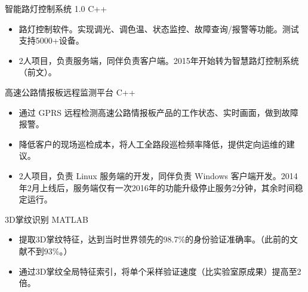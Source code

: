 \documentclass[10pt,a4paper]{moderncv/moderncv}
\begin{document}
{智能路灯控制系统 1.0}
{C++}
{}{}
{
\begin{itemize}
	\item 路灯控制软件。实现调光、调色温、状态监控、故障查询/报警等功能。测试支持5000+设备。
	\item 2人项目，负责服务端，同伴负责客户端。2015年开始转为智慧路灯控制系统（前文）。
\end{itemize}
}

{高速公路情报板远程监测平台}
{C++}
{}{}
{
\begin{itemize}
	\item 通过 GPRS 远程检测高速公路情报板产品的工作状态、实时画面，做到故障报警。
	\item 降低客户的现场巡检成本，将人工全路段巡检频率降低，提供定向运维的建议。
	\item 2人项目，负责 Linux 服务端的开发，同伴负责 Windows 客户端开发。2014年2月上线后，服务端仅有一次2016年的功能升级停止服务2分钟，其余时间稳定运行。
\end{itemize}
}




{3D掌纹识别}
{MATLAB}
{}{}
{
\begin{itemize}
	\item 提取3D掌纹特征，达到当时世界领先的98.7\%的身份验证准确率。（此前的文献不到93\%。）
	\item 通过3D掌纹全局特征索引，将单个采样验证速度（比实验室原成果）提高至2倍。
\end{itemize}
}

\end{document}
